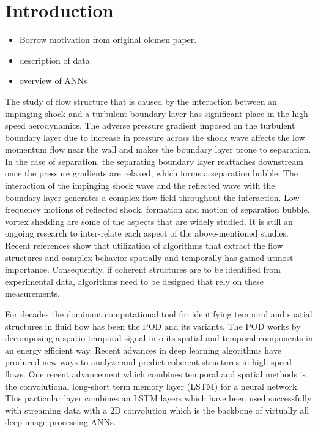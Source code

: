 \documentclass{article}
\begin{document}
\section{Introduction}
\begin{itemize}
    \item Borrow motivation from original olcmen paper.
    \item description of data
    \item overview of ANNs
\end{itemize}

The study of flow structure that is caused by the interaction between an impinging shock and a turbulent boundary layer has significant place in the high speed aerodynamics. The adverse pressure gradient imposed on the turbulent boundary layer due to increase in pressure across the shock wave affects the low momentum flow near the wall and makes the boundary layer prone to separation. In the case of separation, the separating boundary layer reattaches downstream once the pressure gradients are relaxed, which forms a separation bubble. The interaction of the impinging shock wave and the reflected wave with the boundary layer generates a complex flow field throughout the interaction. Low frequency motions of reflected shock, formation and motion of separation bubble, vortex shedding are some of the aspects that are widely studied. It is still an ongoing research to inter-relate each aspect of the above-mentioned studies. Recent references show that utilization of algorithms that extract the flow structures and complex behavior spatially and temporally has gained utmost importance. Consequently, if coherent structures are to be identified from experimental data, algorithms need to be designed that rely on these measurements. 

For decades the dominant computational tool for identifying temporal and spatial structures in fluid flow has been the POD and its variants.  The POD works by decomposing a spatio-temporal signal into its spatial and temporal components in an energy efficient way.  Recent advances in deep learning algorithms have produced new ways to analyze and predict coherent structures in high speed flows.  One recent advancement which combines temporal and spatial methods is the convolutional long-short term memory layer (LSTM) for a neural network.  This particular layer combines an LSTM layers which have been used successfully with streaming data with a 2D convolution which is the backbone of virtually all deep image processing ANNs.
\end{document}
